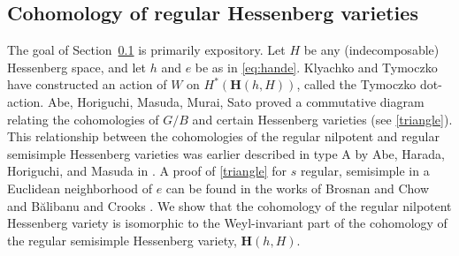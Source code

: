 \documentclass[10pt]{article}
\numberwithin{thm}{section}
\theoremstyle{definition}
\theoremstyle{remark}
\newcommand{\Pet}{\ensuremath{\mathbf{P}}}
\newcommand{\Fl}{\ensuremath{G/B}}
\newcommand{\Hess}{\mathbf H}
\begin{document}

\subsection{Cohomology of regular Hessenberg varieties}
\label{sec:bc}
The goal of Section~\ref{sec:bc} is primarily expository.
Let $H$ be any (indecomposable) Hessenberg space, and let $h$ and $e$ be as in \cref{eq:hande}.
Klyachko \cite{klyachko85,klyachko95} and Tymoczko \cite{tymoczko2007permutation} have constructed an action of $W$ on $H^*(\Hess(h,H))$,
called the Tymoczko dot-action. 
Abe, Horiguchi, Masuda, Murai, Sato \cite{MR4116638} proved a commutative diagram relating the cohomologies of $G/B$ and certain Hessenberg varieties (see \cref{triangle}).
This relationship between the cohomologies of the regular nilpotent and regular semisimple Hessenberg varieties was earlier described in type A by Abe, Harada, Horiguchi, and Masuda in \cite{ahhm:cohomologyring}.
A proof of \cref{triangle} for $s$ regular, semisimple  in a Euclidean neighborhood of $e$ can be found in the works of Brosnan and Chow \cite{brosnan-chow} and
B\u alibanu and Crooks \cite{balibanu2020perverse}. 
We  show that the cohomology of the  regular nilpotent Hessenberg variety is isomorphic to the Weyl-invariant part of the cohomology of the regular semisimple Hessenberg variety, $\Hess(h, H)$.
\end{document}
